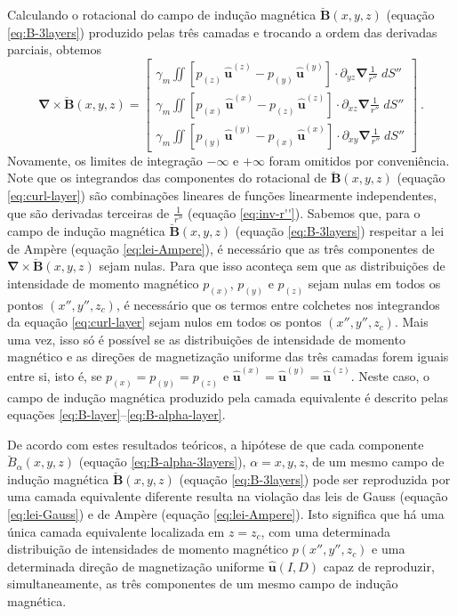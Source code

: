 Calculando o rotacional do campo de indução magnética 
$\breve{\mathbf{B}}(x, y, z)$ (equação \ref{eq:B-3layers}) produzido pelas três camadas 
e trocando a ordem das derivadas parciais, obtemos
\begin{equation}
\boldsymbol{\nabla} \times \breve{\mathbf{B}}(x, y, z) = \begin{bmatrix}
\gamma_{m} \iint
\left[ p_{(z)} \, \hat{\mathbf{u}}^{(z)} - p_{(y)} \, \hat{\mathbf{u}}^{(y)} \right] \cdot 
\partial_{yz} \boldsymbol{\nabla} \frac{1}{r''} \; dS'' \\
\gamma_{m} \iint
\left[ p_{(x)} \, \hat{\mathbf{u}}^{(x)} - p_{(z)} \, \hat{\mathbf{u}}^{(z)} \right] \cdot 
\partial_{xz} \boldsymbol{\nabla} \frac{1}{r''} \; dS'' \\
\gamma_{m} \iint
\left[ p_{(y)} \, \hat{\mathbf{u}}^{(y)} - p_{(x)} \, \hat{\mathbf{u}}^{(x)} \right] \cdot 
\partial_{xy} \boldsymbol{\nabla} \frac{1}{r''} \; dS''
\end{bmatrix} \: .
\label{eq:curl-layer}
\end{equation}
Novamente, os limites de integração $-\infty$ e $+\infty$ foram omitidos por conveniência.
Note que os integrandos das componentes do rotacional de $\breve{\mathbf{B}}(x, y, z)$ 
(equação \ref{eq:curl-layer}) são combinações lineares de funções linearmente 
independentes, que são derivadas terceiras de $\frac{1}{r''}$ (equação \ref{eq:inv-r''}).
Sabemos que, para o campo de indução magnética $\breve{\mathbf{B}}(x, y, z)$ 
(equação \ref{eq:B-3layers}) respeitar a lei de Ampère (equação \ref{eq:lei-Ampere}), é necessário que as 
três componentes de $\boldsymbol{\nabla} \times \breve{\mathbf{B}}(x, y, z)$ sejam nulas. 
Para que isso aconteça sem que as distribuições de intensidade de momento magnético 
$p_{(x)}$, $p_{(y)}$ e $p_{(z)}$ sejam 
nulas em todos os pontos $(x'', y'', z_{c})$, é necessário que os termos entre colchetes
nos integrandos da equação \ref{eq:curl-layer} sejam nulos em todos os pontos $(x'', y'', z_{c})$.
Mais uma vez, isso só é possível se as distribuições de intensidade de momento magnético 
e as direções de magnetização uniforme das três camadas forem iguais entre si, isto é, se 
$p_{(x)} = p_{(y)} = p_{(z)}$ e 
$\hat{\mathbf{u}}^{(x)} = \hat{\mathbf{u}}^{(y)} = \hat{\mathbf{u}}^{(z)}$. Neste caso, o campo de indução magnética produzido pela camada equivalente é descrito pelas equações \ref{eq:B-layer}--\ref{eq:B-alpha-layer}. 

De acordo com estes resultados teóricos, a hipótese de que cada componente $\breve{B}_{\alpha}(x, y, z)$ 
(equação \ref{eq:B-alpha-3layers}), $\alpha = x, y, z$, de um mesmo campo de indução magnética $\breve{\mathbf{B}}(x, y, z)$ 
(equação \ref{eq:B-3layers}) pode ser reproduzida por uma camada equivalente diferente resulta na 
violação das leis de Gauss (equação \ref{eq:lei-Gauss}) e de Ampère (equação \ref{eq:lei-Ampere}).
Isto significa que há uma única camada equivalente localizada em $z = z_{c}$, 
com uma determinada distribuição de intensidades de momento magnético $p(x'', y'', z_{c})$ e uma 
determinada direção de magnetização uniforme $\hat{\mathbf{u}}(I, D)$ capaz de reproduzir, simultaneamente,
as três componentes de um mesmo campo de indução magnética.

